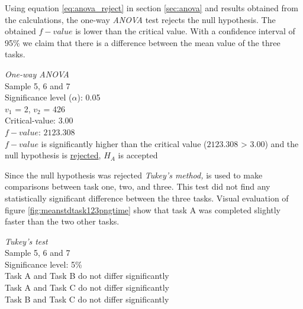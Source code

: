 Using equation \ref{eq:anova_reject} in section \ref{sec:anova} and results obtained from the calculations, the one-way \textit{ANOVA} test rejects the null hypothesis. The obtained $f-value$ is lower than the critical value. With a confidence interval of 95\% we claim that there is a difference between the mean value of the three tasks.
\vspace{0.2cm}
 \begin{center}
	\begin{tcolorbox}[width=0.8\textwidth]
		\centering
		\textit{One-way \textit{ANOVA}}\\
		Sample 5, 6 and 7\\[0.5cm]
		
		Significance level ($\alpha$): 0.05 \\
		$v_1$ = 2, $v_2$ = 426 \\
		Critical-value: 3.00 \\[0.2cm] %
		$f-value$: $2123.308$ \\
		
		$f-value$ is significantly higher than the critical value ($2123.308$ > $3.00$) and the null hypothesis is \underline{rejected}, $H_A$ is accepted\\[0.5cm]
	\end{tcolorbox} 
\end{center}
\vspace{0.2cm}
Since the null hypothesis was rejected \textit{Tukey's method,} is used to make comparisons between task one, two, and three. This test did not find any statistically significant difference between the three tasks. Visual evaluation of figure \ref{fig:meanstdtask123pngtime} show that task A was completed slightly faster than the two other tasks. 
\vspace{0.2cm}
 \begin{center}
	\begin{tcolorbox}[width=0.8\textwidth]
		\centering
		\textit{Tukey's test}\\
		Sample 5, 6 and 7\\
		Significance level: 5\%  \\[0.5cm] 
		
		Task A and Task B do not differ significantly \\
		Task A and Task C do not differ significantly \\
		Task B and Task C do not differ significantly \\[0.2cm]
	\end{tcolorbox} 
\end{center}

